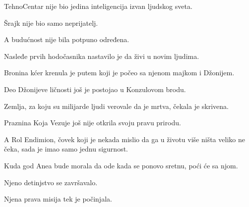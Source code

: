 TehnoCentar nije bio jedina inteligencija izvan ljudskog sveta.

Šrajk nije bio samo neprijatelj.

A budućnost nije bila potpuno određena.

\bigskip

Nasleđe prvih hodočasnika nastavilo je da živi u novim ljudima.

\bigskip

Bronina kćer krenula je putem koji je počeo sa njenom majkom i Džonijem.

Deo Džonijeve ličnosti još je postojao u Konzulovom brodu.

Zemlja, za koju su milijarde ljudi verovale da je mrtva, čekala je skrivena.

Praznina Koja Vezuje još nije otkrila svoju pravu prirodu.

\bigskip

A Rol Endimion, čovek koji je nekada mislio da ga u životu više ništa veliko ne čeka, sada je imao samo jednu sigurnost.

\bigskip

Kuda god Anea bude morala da ode kada se ponovo sretnu, poći će sa njom.

\bigskip

Njeno detinjstvo se završavalo.

\bigskip

Njena prava misija tek je počinjala.